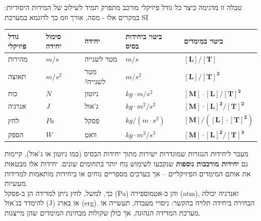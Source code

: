 \documentclass[
  hebrew,
  letterpaper,
  DIV=11,
  numbers=noendperiod]{scrreprt}
\begin{document}
טבלה זו מדגימה כיצד כל גודל פיזיקלי מורכב מתפרק תמיד לשילוב של המידות
היסודיות: במקרים אלו - מסה, אורך וזמ {כך לדוגמא במערכת} SI

\begin{longtable}[]{@{}
  >{\centering\arraybackslash}p{}
  >{\centering\arraybackslash}p{}
  >{\centering\arraybackslash}p{}
  >{\centering\arraybackslash}p{}
  >{\centering\arraybackslash}p{}@{}}
\toprule\noalign{}
\begin{minipage}[b]{\linewidth}\centering
\textbf{גודל פיזיקלי}
\end{minipage} & \begin{minipage}[b]{\linewidth}\centering
\textbf{סימול יחידה}
\end{minipage} & \begin{minipage}[b]{\linewidth}\centering
\textbf{יחידה}
\end{minipage} & \begin{minipage}[b]{\linewidth}\centering
\textbf{ביטוי ביחידות בסיס}
\end{minipage} & \begin{minipage}[b]{\linewidth}\centering
\textbf{ביטוי במימדים}
\end{minipage} \\
\midrule\noalign{}
\endhead
\bottomrule\noalign{}
\endlastfoot
מהירות & \(m/s\) & מטר לשנייה & \(m/s\) &
\([\mathbf{L}]/[\mathbf{T}]\) \\
תאוצה & \(m/s^2\) & מטר לשנייה² & \(m/s^2\) &
\([\mathbf{L}]/[\mathbf{T}]^{\mathbf{2}}\) \\
כוח & \(N\) & ניוטון & \(kg \cdot m/s^2\) &
\([\mathbf{M}]\cdot[\mathbf{L}]/[\mathbf{T}]^{\mathbf{2}}\) \\
אנרגיה & \(J\) & ג'אול & \(kg \cdot m^2/s^2\) &
\([\mathbf{M}]\cdot[\mathbf{L}]^{\mathbf{2}}/[\mathbf{T}]^{\mathbf{2}}\) \\
לחץ & \(Pa\) & פסקל & \(kg/(m \cdot s^2)\) &
\([\mathbf{M}]/([\mathbf{L}]\cdot[\mathbf{T}]^{\mathbf{2}})\) \\
הספק & \(W\) & וואט & \(kg \cdot m^2/s^3\) &
\([\mathbf{M}]\cdot[\mathbf{L}]^{\mathbf{2}}/[\mathbf{T}]^{\mathbf{3}}\) \\
\end{longtable}

{מעבר ליחידות הנגזרות שמוגדרות ישירות מתוך יחידות הבסיס (כמו ניוטון או
ג'אול), קיימות גם \textbf{יחידות מורכבות נוספות} שנקבעו לשימוש נוח יותר
בתחומים שונים. יחידות אלו מבטאות את אותם המימדים הפיזיקליים -- אך בערכים
מספריים נוחים או ביחידות מותאמות למדידות מעשיות}.\\
{כך, למשל, לחץ ניתן למדידה הן ב}-{פסקל} (Pa) {והן ב}-{אטמוספירה} (atm),
{ואנרגיה יכולה להימדד בג'אול} (J) {או בארג} (erg). {הבחירה ביחידה תלויה
בהקשר}: {ניסויי מעבדה, תעשייה או מערכת המדידה הנהוגה, אך כולן שקולות
מבחינת המימדים שהן מייצגות}.
\end{document}
